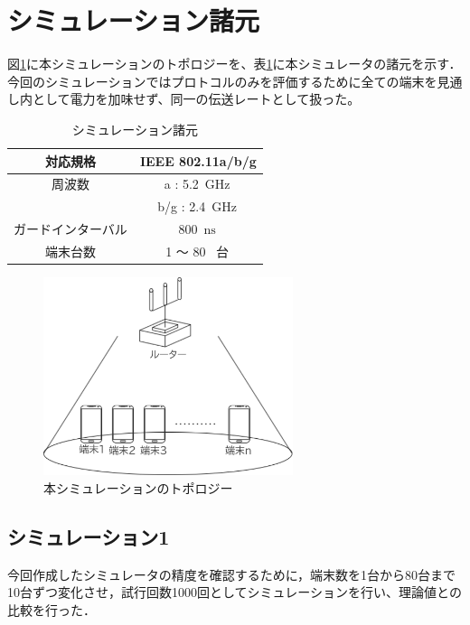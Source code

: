 \documentclass[a4paper,10pt]{ltjsarticle}
\begin{document}
\clearpage
\section{シミュレーション諸元}

図\ref{fig:topology}に本シミュレーションのトポロジーを、表\ref{tab:sim-base-param}に本シミュレータの諸元を示す．今回のシミュレーションではプロトコルのみを評価するために全ての端末を見通し内として電力を加味せず、同一の伝送レートとして扱った。

\begin{table}[H]
  \centering
  \caption{シミュレーション諸元}
  \label{tab:sim-base-param}
  \begin{tabular}{c|c}
    \hline
    対応規格 & IEEE 802.11a/b/g \\ 
    \hline
    周波数 & a : 5.2  \,$\mathrm{GHz}$\, \\
    & b/g : 2.4  \,$\mathrm{GHz}$\, \\
    \hline
    ガードインターバル & 800  \,$\mathrm{ns}$\, \\
    \hline
    端末台数 & 1 ～ 80 \, 台\, \\
    \hline
  \end{tabular}
\end{table}

\begin{figure}[H]
  \centering
  \includegraphics[width=0.65\textwidth]{./assets/topology.png}
  \caption{本シミュレーションのトポロジー}
  \label{fig:topology}
\end{figure}

\clearpage
\subsection{シミュレーション1}
今回作成したシミュレータの精度を確認するために，端末数を1台から80台まで10台ずつ変化させ，試行回数1000回としてシミュレーションを行い、理論値\cite{paper}との比較を行った．
\end{document}
